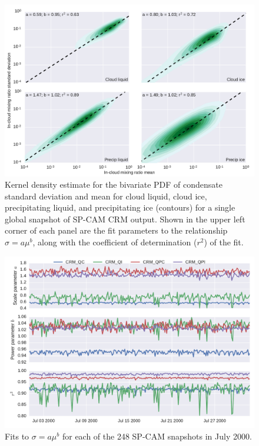 \begin{figure}
\centering
\includegraphics[width=\columnwidth]{graphics/subgrid2_mxratio_variance.pdf}
\caption{Kernel density estimate for the bivariate PDF of condensate standard deviation and mean for cloud liquid, cloud ice, precipitating liquid, and precipitating ice (contours) for a single global snapshot of SP-CAM CRM output. Shown in the upper left corner of each panel are the fit parameters to the relationship $\sigma = a \mu^b$, along with the coefficient of determination ($r^2$) of the fit.}
\label{subgrid2_mxratio_variance}
\end{figure}

\begin{figure}
\centering
\includegraphics[width=\columnwidth]{graphics/subgrid2_mxratio_variance_fits.pdf}
\caption{Fits to $\sigma = a \mu^b$ for each of the 248 SP-CAM snapshots in July 2000.}
\label{subgrid2_mxratio_variance_fits}
\end{figure}

